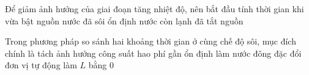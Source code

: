 \begin{ex}
Để giảm ảnh hưởng của giai đoạn tăng nhiệt độ, nên bắt đầu tính thời gian khi
\choice
{vừa bật nguồn}
{\True nước đã sôi ổn định}
{nước còn lạnh}
{đã tắt nguồn}
\end{ex}

\begin{ex}
Trong phương pháp so sánh hai khoảng thời gian ở cùng chế độ sôi, mục đích chính là
\choice
{\True tách ảnh hưởng công suất hao phí gần ổn định}
{làm nước đông đặc}
{đổi đơn vị tự động}
{làm $L$ bằng 0}
\end{ex}
